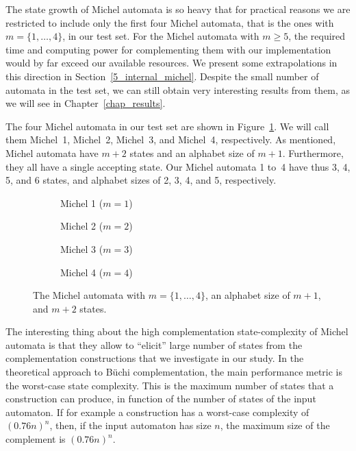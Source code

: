The state growth of Michel automata is so heavy that for practical reasons we are restricted to include only the first four Michel automata, that is the ones with $m=\{1,\dots,4\}$, in our test set. For the Michel automata with $m \geq 5$, the required time and computing power for complementing them with our implementation would by far exceed our available resources. We present some extrapolations in this direction in Section~\ref{5_internal_michel}. Despite the small number of automata in the test set, we can still obtain very interesting results from them, as we will see in Chapter~\ref{chap_results}.

The four Michel automata in our test set are shown in Figure~\ref{michel_automata}. We will call them Michel~1, Michel~2, Michel~3, and Michel~4, respectively. As mentioned, Michel automata have $m+2$ states and an alphabet size of $m+1$. Furthermore, they all have a single accepting state. Our Michel automata 1 to~4 have thus 3, 4, 5, and 6 states, and alphabet sizes of 2, 3, 4, and 5, respectively.

\newcommand{\subwidth}{0.42}
\begin{figure}[htb!]
\centering
  \begin{subfigure}[t]{\subwidth\textwidth}
  \MichelOne
  \caption{Michel 1 ($m=1$)}
  \end{subfigure}
  \begin{subfigure}[t]{\subwidth\textwidth}
  \MichelTwo
  \caption{Michel 2 ($m=2$)}
  \end{subfigure}

  \begin{subfigure}[b]{\subwidth\textwidth}
  \MichelThree
  \caption{Michel 3 ($m=3$)}
  \end{subfigure}
  \begin{subfigure}[b]{\subwidth\textwidth}
  \MichelFour
  \caption{Michel 4 ($m=4$)}
  \end{subfigure}
\caption{The Michel automata with $m = \{1,\dots,4\}$, an alphabet size of $m+1$, and $m+2$ states.}
\label{michel_automata}
\end{figure}

The interesting thing about the high complementation state-complexity of Michel automata is that they allow to ``elicit'' large number of states from the complementation constructions that we investigate in our study. In the theoretical approach to Büchi complementation, the main performance metric is the worst-case state complexity. This is the maximum number of states that a construction can produce, in function of the number of states of the input automaton. If for example a construction has a worst-case complexity of $(0.76n)^n$, then, if the input automaton has size $n$, the maximum size of the complement is $(0.76n)^n$.

